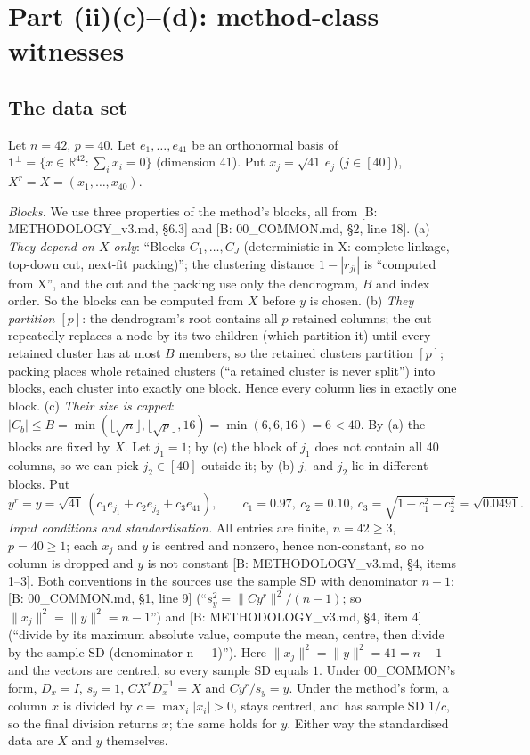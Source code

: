 \documentclass[11pt]{article}
\theoremstyle{remark}
\begin{document}
\section{Part (ii)(c)--(d): method-class witnesses}

\subsection{The data set}
Let $n=42$, $p=40$. Let $e_1,\dots,e_{41}$ be an orthonormal basis of $\mathbf 1^\perp=\{x\in\mathbb R^{42}:\sum_i x_i=0\}$ (dimension 41). Put $x_j=\sqrt{41}\,e_j$ ($j\in[40]$), $X^r=X=(x_1,\dots,x_{40})$.

\emph{Blocks.} We use three properties of the method's blocks, all from [B: METHODOLOGY\_v3.md, \S6.3] and [B: 00\_COMMON.md, \S2, line 18].
(a) \emph{They depend on $X$ only}: ``Blocks $C_1,\dots,C_J$ (deterministic in X: complete linkage, top-down cut, next-fit packing)''; the clustering distance $1-|r_{jl}|$ is ``computed from X'', and the cut and the packing use only the dendrogram, $B$ and index order. So the blocks can be computed from $X$ before $y$ is chosen.
(b) \emph{They partition $[p]$}: the dendrogram's root contains all $p$ retained columns; the cut repeatedly replaces a node by its two children (which partition it) until every retained cluster has at most $B$ members, so the retained clusters partition $[p]$; packing places whole retained clusters (``a retained cluster is never split'') into blocks, each cluster into exactly one block. Hence every column lies in exactly one block.
(c) \emph{Their size is capped}: $|C_b|\le B=\min(\lfloor\sqrt n\rfloor,\lfloor\sqrt p\rfloor,16)=\min(6,6,16)=6<40$.
By (a) the blocks are fixed by $X$. Let $j_1=1$; by (c) the block of $j_1$ does not contain all 40 columns, so we can pick $j_2\in[40]$ outside it; by (b) $j_1$ and $j_2$ lie in different blocks. Put
\[
y^r=y=\sqrt{41}\,(c_1e_{j_1}+c_2e_{j_2}+c_3e_{41}),\qquad c_1=0.97,\ c_2=0.10,\ c_3=\sqrt{1-c_1^2-c_2^2}=\sqrt{0.0491}.
\]
\emph{Input conditions and standardisation.} All entries are finite, $n=42\ge3$, $p=40\ge1$; each $x_j$ and $y$ is centred and nonzero, hence non-constant, so no column is dropped and $y$ is not constant [B: METHODOLOGY\_v3.md, \S4, items 1--3]. Both conventions in the sources use the sample SD with denominator $n-1$: [B: 00\_COMMON.md, \S1, line 9] (``$s_y^2=\|Cy^r\|^2/(n-1)$; so $\|x_j\|^2=\|y\|^2=n-1$'') and [B: METHODOLOGY\_v3.md, \S4, item 4] (``divide by its maximum absolute value, compute the mean, centre, then divide by the sample SD (denominator n $-$ 1)''). Here $\|x_j\|^2=\|y\|^2=41=n-1$ and the vectors are centred, so every sample SD equals $1$. Under 00\_COMMON's form, $D_x=I$, $s_y=1$, $CX^rD_x^{-1}=X$ and $Cy^r/s_y=y$. Under the method's form, a column $x$ is divided by $c=\max_i|x_i|>0$, stays centred, and has sample SD $1/c$, so the final division returns $x$; the same holds for $y$. Either way the standardised data are $X$ and $y$ themselves.
\end{document}
